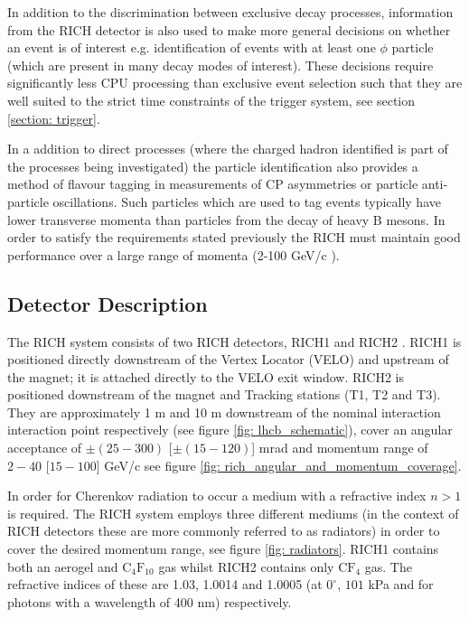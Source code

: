 In addition to the discrimination between exclusive decay processes, information from the RICH detector is also used to make more general decisions on whether an event is of interest e.g. identification of events with at least one $\phi$ particle (which are present in many decay modes of interest). These decisions require significantly less CPU processing than exclusive event selection such that they are well suited to the strict time constraints of the trigger system, see section \ref{section: trigger}.

In a addition to direct processes (where the charged hadron identified is part of the processes being investigated) the particle identification also provides a method of flavour tagging in measurements of CP asymmetries or particle anti-particle oscillations. Such particles which are used to tag events typically have lower transverse momenta than particles from the decay of heavy B mesons. In order to satisfy the requirements stated previously the RICH must maintain good performance over a large range of momenta (2-100 GeV/c \cite{JHEP10(2012)037}).

\subsection*{Detector Description}

The RICH system consists of two RICH detectors, RICH1 and RICH2 \cite{Amato:494263}. RICH1 is positioned directly downstream of the Vertex Locator (VELO) and upstream of the magnet; it is attached directly to the VELO exit window. RICH2 is positioned downstream of the magnet and Tracking stations (T1, T2 and T3). They are approximately 1 m and 10 m downstream of the nominal interaction interaction point respectively (see figure \ref{fig: lhcb_schematic}), cover an angular acceptance of $\pm(25-300)$ [$\pm(15-120)$] mrad and momentum range of $2-40$ [$15-100$] GeV/c see figure \ref{fig: rich_angular_and_momentum_coverage}.

In order for Cherenkov radiation to occur a medium with a refractive index $n>1$ is required. The RICH system employs three different mediums (in the context of RICH detectors these are more commonly referred to as radiators) in order to cover the desired momentum range, see figure \ref{fig: radiators}. RICH1 contains both an aerogel and $\mathrm{C}_4\mathrm{F}_{10}$ gas whilst RICH2 contains only $\mathrm{CF}_4$ gas. The refractive indices of these are 1.03, 1.0014 and 1.0005 (at $0^\circ$, $101$ kPa and for photons with a wavelength of 400 nm) respectively.

